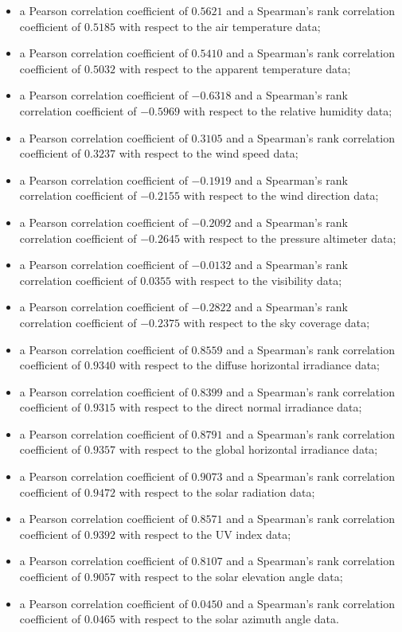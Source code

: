 \begin{itemize}
  \item a Pearson correlation coefficient of $0.5621$ and a Spearman's rank correlation coefficient of $0.5185$ with respect to the air temperature data;
  \item a Pearson correlation coefficient of $0.5410$ and a Spearman's rank correlation coefficient of $0.5032$ with respect to the apparent temperature data;
  \item a Pearson correlation coefficient of $-0.6318$ and a Spearman's rank correlation coefficient of $-0.5969$ with respect to the relative humidity data;
  \item a Pearson correlation coefficient of $0.3105$ and a Spearman's rank correlation coefficient of $0.3237$ with respect to the wind speed data;
  \item a Pearson correlation coefficient of $-0.1919$ and a Spearman's rank correlation coefficient of $-0.2155$ with respect to the wind direction data;
  \item a Pearson correlation coefficient of $-0.2092$ and a Spearman's rank correlation coefficient of $-0.2645$ with respect to the pressure altimeter data;
  \item a Pearson correlation coefficient of $-0.0132$ and a Spearman's rank correlation coefficient of $0.0355$ with respect to the visibility data;
  \item a Pearson correlation coefficient of $-0.2822$ and a Spearman's rank correlation coefficient of $-0.2375$ with respect to the sky coverage data;
  \item a Pearson correlation coefficient of $0.8559$ and a Spearman's rank correlation coefficient of $0.9340$ with respect to the diffuse horizontal irradiance data;
  \item a Pearson correlation coefficient of $0.8399$ and a Spearman's rank correlation coefficient of $0.9315$ with respect to the direct normal irradiance data;
  \item a Pearson correlation coefficient of $0.8791$ and a Spearman's rank correlation coefficient of $0.9357$ with respect to the global horizontal irradiance data;
  \item a Pearson correlation coefficient of $0.9073$ and a Spearman's rank correlation coefficient of $0.9472$ with respect to the solar radiation data;
  \item a Pearson correlation coefficient of $0.8571$ and a Spearman's rank correlation coefficient of $0.9392$ with respect to the UV index data;
  \item a Pearson correlation coefficient of $0.8107$ and a Spearman's rank correlation coefficient of $0.9057$ with respect to the solar elevation angle data;
  \item a Pearson correlation coefficient of $0.0450$ and a Spearman's rank correlation coefficient of $0.0465$ with respect to the solar azimuth angle data.
\end{itemize}
